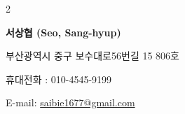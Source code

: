 \documentclass[11pt]{article} %
\def\KoreanMode{1}
\begin{document}
\newcommand\profile{
	{\LARGE\bfseries 서상협 (Seo, Sang-hyup)} %
	\bigskip\bigskip\medskip %
	
	부산광역시 중구 보수대로56번길 15 806호 %
	\medskip %
	
	휴대전화 : 010-4545-9199 %
	\medskip %
	
	E-mail: \href{mailto:saibie1677@gmail.com}{saibie1677@gmail.com}\\ %
}

\newcommand\profileeng{
	{\LARGE\bfseries Seo, Sang-hyup (서상협)} %
	\bigskip\bigskip\medskip %
	
	48973, No.806, 15, Bosu-daero 56beon-gil, Jung-gu, Busan, Republic of Korea %
	\medskip %
	
	Mobile : 010-4545-9199 %
	\medskip %
	
	E-mail: \href{mailto:saibie1677@gmail.com}{saibie1677@gmail.com}\\ %
}





%

\if\KoreanMode2
\else
\profile

%
\end{document}
